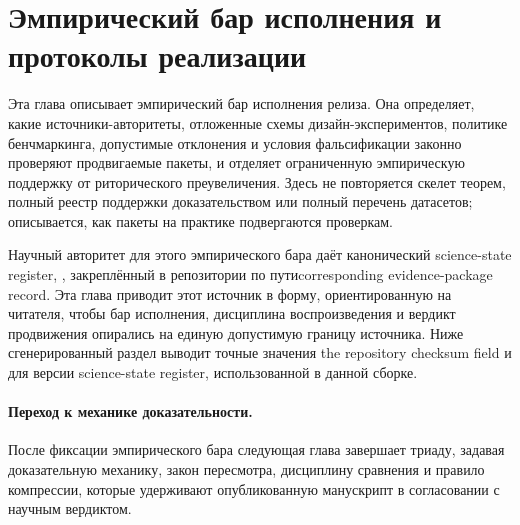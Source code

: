 \section{Эмпирический бар исполнения и протоколы реализации}
\label{sec:oc-core-1-3-empirical-execution-protocols}

Эта глава описывает эмпирический бар исполнения релиза. Она определяет, какие
источники-авторитеты, отложенные схемы дизайн-экспериментов, политике
бенчмаркинга, допустимые отклонения и условия фальсификации законно
проверяют продвигаемые пакеты, и отделяет ограниченную эмпирическую
поддержку от риторического преувеличения. Здесь не повторяется
скелет теорем, полный реестр поддержки доказательством или полный перечень
датасетов; описывается, как пакеты на практике подвергаются проверкам.

Научный авторитет для этого эмпирического бара даёт канонический
science-state register, , закреплённый в репозитории
по путиcorresponding evidence-package record.
Эта глава приводит этот источник в форму, ориентированную на читателя, чтобы
бар исполнения, дисциплина воспроизведения и вердикт продвижения опирались на
единую допустимую границу источника. Ниже сгенерированный раздел выводит
точные значения the repository checksum field и 
для версии science-state register, использованной в данной сборке.

\begingroup
\small

\endgroup

\paragraph{Переход к механике доказательности.}
После фиксации эмпирического бара следующая глава завершает триаду, задавая
доказательную механику, закон пересмотра, дисциплину сравнения и правило
компрессии, которые удерживают опубликованную манускрипт в согласовании с
научным вердиктом.
